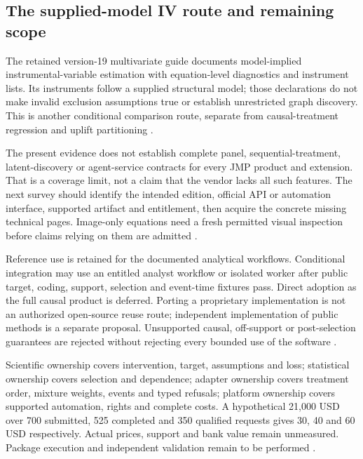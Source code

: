 \subsection{The supplied-model IV route and remaining scope}
The retained version-19 multivariate guide documents model-implied
instrumental-variable estimation with equation-level diagnostics and
instrument lists. Its instruments follow a supplied structural model;
those declarations do not make invalid exclusion assumptions true or
establish unrestricted graph discovery. This is another conditional
comparison route, separate from causal-treatment regression and uplift
partitioning \cite{exec13_ivrd_jmp}.

The present evidence does not establish complete panel, sequential-treatment,
latent-discovery or agent-service contracts for every JMP product and
extension. That is a coverage limit, not a claim that the vendor lacks all
such features. The next survey should identify the intended edition,
official API or automation interface, supported artifact and entitlement,
then acquire the concrete missing technical pages. Image-only equations
need a fresh permitted visual inspection before claims relying on them
are admitted \cite{exec24_jmp_choice}.

Reference use is retained for the documented analytical workflows.
Conditional integration may use an entitled analyst workflow or isolated
worker after public target, coding, support, selection and event-time
fixtures pass. Direct adoption as the full causal product is deferred.
Porting a proprietary implementation is not an authorized open-source
reuse route; independent implementation of public methods is a separate
proposal. Unsupported causal, off-support or post-selection guarantees
are rejected without rejecting every bounded use of the software
\cite{exec24_jmp_choice}.

Scientific ownership covers intervention, target, assumptions and loss;
statistical ownership covers selection and dependence; adapter ownership
covers treatment order, mixture weights, events and typed refusals; platform
ownership covers supported automation, rights and complete costs. A
hypothetical 21,000 USD over 700 submitted, 525 completed and 350
qualified requests gives 30, 40 and 60 USD respectively. Actual prices,
support and bank value remain unmeasured. Package execution and independent validation remain to be performed
\cite{exec24_jmp_choice}.


